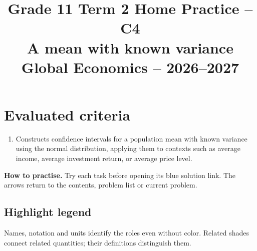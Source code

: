 \makeatletter
{}
\makeatother




\CoordinatedTermTwoPalette
\usepackage{needspace}
\usepackage{titling}
\setlength{\droptitle}{-2em}
\pretitle{\par\begingroup\centering\LARGE}
\posttitle{\par\endgroup}
\preauthor{}\postauthor{}
\predate{}\postdate{}
\maketitlehookd{\vspace{-1em}}
\linespread{1.12}
\setlength{\parskip}{5pt}

\title{Grade 11 Term 2 Home Practice -- C4\\\large A mean with known variance\\[0.25em]
	\normalsize Global Economics -- 2026--2027}
\author{}
\date{}


	\maketitle

	\setcounter{tocdepth}{1}
	\setcounter{secnumdepth}{2}
	\label{toc}
	\tableofcontents

	\section*{Evaluated criteria}
	\begin{enumerate}[label=\textbf{C\arabic*},start=4]
		\item Constructs confidence intervals for a population mean with known variance using the normal distribution, applying them to contexts such as average income, average investment return, or average price level.
	\end{enumerate}

	\textbf{How to practise.} Try each task before opening its blue solution link. The arrows return to the contents, problem list or current problem.


\subsection*{Highlight legend}
\label{tab:highlight-legend}
Names, notation and units identify the roles even without color. Related shades connect related quantities; their definitions distinguish them.

